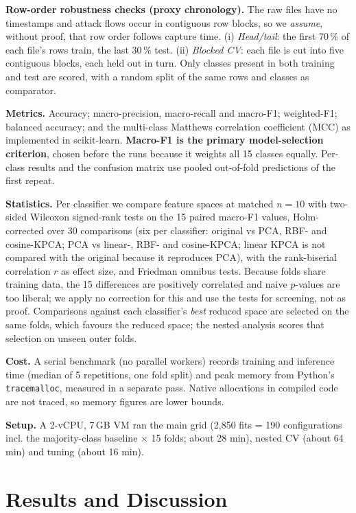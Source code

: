 \documentclass[runningheads]{llncs}
\begin{document}
\textbf{Row-order robustness checks (proxy chronology).} The raw files have no timestamps and attack flows occur in contiguous row blocks, so we \emph{assume}, without proof, that row order follows capture time. (i) \emph{Head/tail}: the first 70\,\% of each file's rows train, the last 30\,\% test. (ii) \emph{Blocked CV}: each file is cut into five contiguous blocks, each held out in turn. Only classes present in both training and test are scored, with a random split of the same rows and classes as comparator.

\textbf{Metrics.} Accuracy; macro-precision, macro-recall and macro-F1; weighted-F1; balanced accuracy; and the multi-class Matthews correlation coefficient (MCC) as implemented in scikit-learn. \textbf{Macro-F1 is the primary model-selection criterion}, chosen before the runs because it weights all 15 classes equally. Per-class results and the confusion matrix use pooled out-of-fold predictions of the first repeat.

\textbf{Statistics.} Per classifier we compare feature spaces at matched $n=10$ with two-sided Wilcoxon signed-rank tests on the 15 paired macro-F1 values, Holm-corrected over 30 comparisons (six per classifier: original vs PCA, RBF- and cosine-KPCA; PCA vs linear-, RBF- and cosine-KPCA; linear KPCA is not compared with the original because it reproduces PCA), with the rank-biserial correlation $r$ as effect size, and Friedman omnibus tests. Because folds share training data, the 15 differences are positively correlated and naive $p$-values are too liberal; we apply no correction for this and use the tests for screening, not as proof. Comparisons against each classifier's \emph{best} reduced space are selected on the same folds, which favours the reduced space; the nested analysis scores that selection on unseen outer folds.

\textbf{Cost.} A serial benchmark (no parallel workers) records training and inference time (median of 5 repetitions, one fold split) and peak memory from Python's \texttt{tracemalloc}, measured in a separate pass. Native allocations in compiled code are not traced, so memory figures are lower bounds.

\textbf{Setup.} A 2-vCPU, 7\,GB VM ran the main grid (2{,}850 fits = 190 configurations incl. the majority-class baseline $\times$ 15 folds; about 28 min), nested CV (about 64 min) and tuning (about 16 min).

\section{Results and Discussion}
\end{document}
